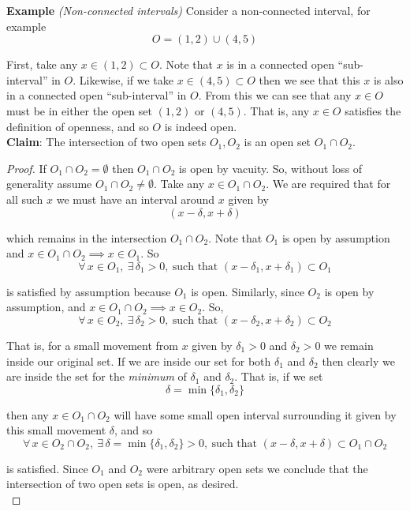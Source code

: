 \documentclass[12pt]{article}
\newlength\tindent
\renewcommand{\indent}{\hspace*{\tindent}}
\begin{document}
%
%
{\bf Example} {\em (Non-connected intervals)} Consider a non-connected interval, for example
\begin{equation*}
	O = (1, 2) \cup (4, 5)
\end{equation*}

\indent First, take any $x \in (1,2) \subset O$. Note that $x$ is in a connected open ``sub-interval'' in $O$. Likewise, if we take $x \in (4,5) \subset O$ then we see that this $x$ is also in a connected open ``sub-interval'' in $O$. From this we can see that any $x \in O$ must be in either the open set $(1, 2)$ or $(4, 5)$. That is, any $x \in O$ satisfies the definition of openness, and so $O$ is indeed open. \\

%
%
{\bf Claim}: The intersection of two open sets $O_1, O_2$ is an open set $O_1 \cap O_2$.

\begin{proof} If $O_1 \cap O_2 = \emptyset$ then $O_1 \cap O_2$ is open by vacuity. So, without loss of generality assume $O_1 \cap O_2 \neq \emptyset$. Take any $x \in O_1 \cap O_2$. We are required that for all such $x$ we must have an interval around $x$ given by
\begin{equation*}
	(x - \delta, x + \delta)
\end{equation*}

which remains in the intersection $O_1 \cap O_2$. Note that $O_1$ is open by assumption and $x \in O_1 \cap O_2 \implies x \in O_1$. So
\begin{equation*}
	\forall\,x \in O_1,~\exists\,\delta_1 > 0,~ \text{such that } (x - \delta_1, x + \delta_1) \subset O_1
\end{equation*}

is satisfied by assumption because $O_1$ is open. Similarly, since $O_2$ is open by assumption, and $x \in O_1 \cap O_2 \implies x \in O_2$. So,
\begin{equation*}
	\forall\,x \in O_2,~\exists\,\delta_2 > 0,~ \text{such that } (x - \delta_2, x + \delta_2) \subset O_2
\end{equation*}

\indent That is, for a small movement from $x$ given by $\delta_1 > 0$ and $\delta_2 > 0$ we remain inside our original set. If we are inside our set for both $\delta_1$ and $\delta_2$ then clearly we are inside the set for the {\em minimum} of $\delta_1$ and $\delta_2$. That is, if we set
\begin{equation*}
	\delta = \min\{\delta_1,\delta_2\}
\end{equation*}

then any $x \in O_1 \cap O_2$ will have some small open interval surrounding it given by this small movement $\delta$, and so
\begin{equation*}
	\forall\,x \in O_2 \cap O_2 ,~\exists\,\delta = \min \{\delta_1, \delta_2\} > 0,~ \text{such that } (x - \delta, x + \delta) \subset O_1 \cap O_2
\end{equation*}

is satisfied. Since $O_1$ and $O_2$ were arbitrary open sets we conclude that the intersection of two open sets is open, as desired. \\
\end{proof}
\end{document}
